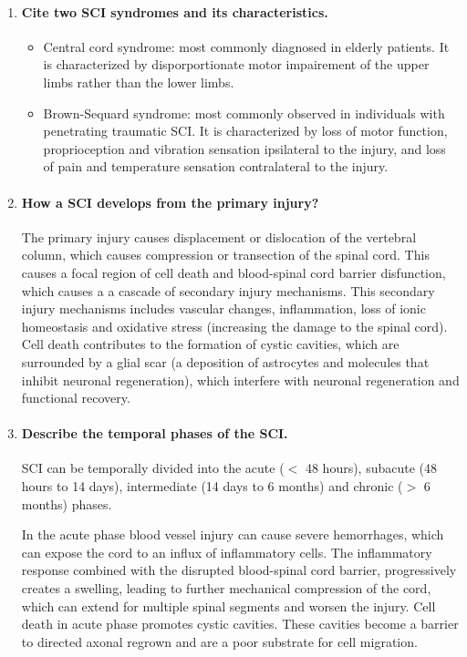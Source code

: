 \documentclass[12pt,article,oneside,a4paper]{memoir}
\begin{document}
\begin{enumerate}
\item \paragraph{Cite two SCI syndromes and its characteristics.}
\begin{itemize}
\item Central cord syndrome: most commonly diagnosed in elderly patients. It is
characterized by disporportionate motor impairement of the upper limbs rather
than the lower limbs.
\item Brown-Sequard syndrome: most commonly observed in individuals with
penetrating traumatic SCI. It is characterized by loss of motor function,
proprioception and vibration sensation ipsilateral to the injury, and loss of
pain and temperature sensation contralateral to the injury.
\end{itemize}

\item \paragraph{How a SCI develops from the primary injury?}
The primary injury causes displacement or dislocation of the vertebral column,
which causes compression or transection of the spinal cord. This causes a focal
region of cell death and blood-spinal cord barrier disfunction, which causes a 
a cascade of secondary injury mechanisms. This secondary injury mechanisms
includes vascular changes, inflammation, loss of ionic homeostasis and
oxidative stress (increasing the damage to the spinal cord). Cell death
contributes to the formation of cystic cavities, which are surrounded by a
glial scar (a deposition of astrocytes and molecules that inhibit neuronal
regeneration), which interfere with neuronal regeneration and functional
recovery.

\item \paragraph{Describe the temporal phases of the SCI.}
SCI can be temporally divided into the acute ($<$ 48 hours), subacute (48 hours
to 14 days), intermediate (14 days to 6 months) and chronic ($>$ 6 months)
phases.

In the acute phase blood vessel injury can cause severe hemorrhages, which can
expose the cord to an influx of inflammatory cells. The inflammatory response
combined with the disrupted blood-spinal cord barrier, progressively creates a
swelling, leading to further mechanical compression of the cord, which can
extend for multiple spinal segments and worsen the injury. Cell death in acute
phase promotes cystic cavities. These cavities become a barrier to directed
axonal regrown and are a poor substrate for cell migration.


\end{enumerate}
\end{document}
